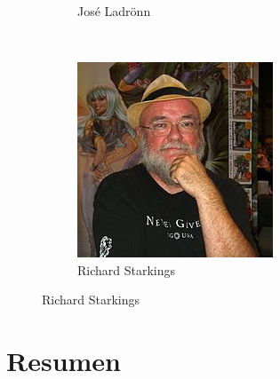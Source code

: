 \begin{frame}{}
\begin{figure}[htp]
\begin{subfigure}[b]{0.17\textwidth}
   \caption{José Ladrönn}
 \end{subfigure}
~
 \begin{subfigure}[b]{0.17\textwidth}
   \includegraphics[width=\textwidth]{img/artistas/RichardStarkings}
   \caption{Richard Starkings}
 \end{subfigure}
\end{figure}
\end{frame}

\section{Resumen}

